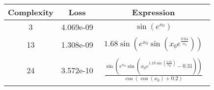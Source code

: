 \begin{center}
        \begin{tabular}{|c|c|c|}
        \hline
        Complexity & Loss & Expression \\
        \hline
        3 & 4.069e-09 & $\begin{aligned}\sin{\left(e^{x_{0}} \right)}\end{aligned}$\\ \hline13 & 1.308e-09 & $\begin{aligned}1.68 \sin{\left(e^{x_{0}} \sin{\left(x_{0} e^{\frac{0.64}{x_{0}}} \right)} \right)}\end{aligned}$\\ \hline24 & 3.572e-10 & $\begin{aligned}\frac{\sin{\left(e^{x_{0}} \sin{\left(x_{0} e^{1.18 \sin{\left(\frac{0.58}{x_{0}} \right)}} - 0.31 \right)} \right)}}{\cos{\left(\cos{\left(x_{0} \right)} + 0.2 \right)}}\end{aligned}$\\ \hline\end{tabular}
        \end{center}
        